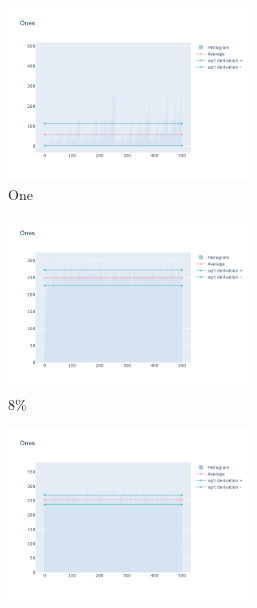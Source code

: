 \documentclass[12pt, fleqn]{report}                             %
\theoremstyle{break}                                            %
\begin{document}
        \begin{figure}[h!]
          \centering
          \begin{subfigure}[b]{0.4\linewidth}
            \includegraphics[width=0.7\textwidth]{Images/126/dia-a.png}
            \caption{One}
          \end{subfigure}
          \begin{subfigure}[b]{0.4\linewidth}
            \includegraphics[width=0.7\textwidth]{Images/126/dia-b.png}
            \caption{8\%}
          \end{subfigure}
          \begin{subfigure}[b]{0.4\linewidth}
            \includegraphics[width=0.7\textwidth]{Images/126/dia-c.png}

\end{subfigure}
\end{figure}
\end{document}

